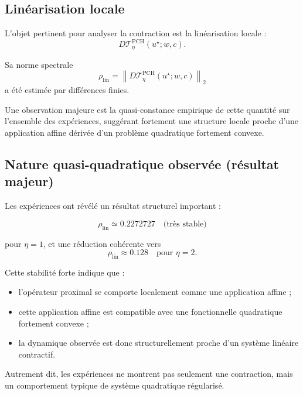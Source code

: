 \documentclass[11pt,a4paper]{article}
\newcommand{\1}{\mathbf 1}
\begin{document}
\subsection{Linéarisation locale}

L’objet pertinent pour analyser la contraction est la linéarisation locale :
\[
D\mathcal T_\eta^{\mathrm{PCH}}(u^\star;w,c).
\]

Sa norme spectrale
\[
\rho_{\mathrm{lin}}
=
\left\|D\mathcal T_\eta^{\mathrm{PCH}}(u^\star;w,c)\right\|_2
\]
a été estimée par différences finies.

Une observation majeure est la quasi-constance empirique de cette quantité sur l’ensemble des expériences, suggérant fortement une structure locale proche d’une application affine dérivée d’un problème quadratique fortement convexe.

\subsection{Nature quasi-quadratique observée (résultat majeur)}

Les expériences ont révélé un résultat structurel important :

\[
\rho_{\mathrm{lin}} \simeq 0.2272727
\quad \text{(très stable)}
\]

pour \(\eta=1\), et une réduction cohérente vers
\[
\rho_{\mathrm{lin}} \approx 0.128
\quad \text{pour } \eta=2.
\]

Cette stabilité forte indique que :

\begin{itemize}
\item l’opérateur proximal se comporte localement comme une application affine ;
\item cette application affine est compatible avec une fonctionnelle quadratique fortement convexe ;
\item la dynamique observée est donc structurellement proche d’un système linéaire contractif.
\end{itemize}

Autrement dit, les expériences ne montrent pas seulement une contraction, mais un comportement typique de système quadratique régularisé.

\end{document}
